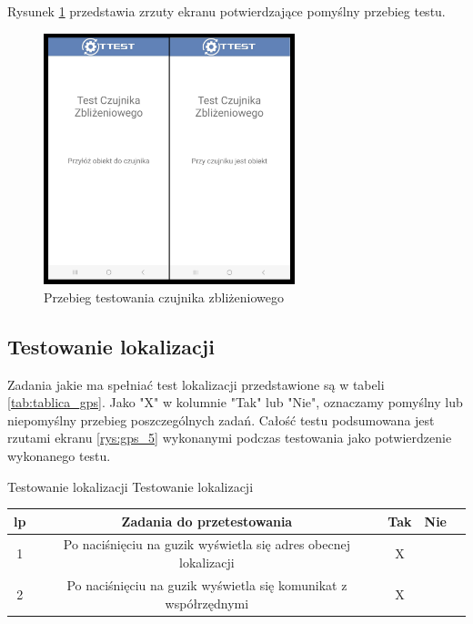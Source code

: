 Rysunek \ref{rys:zblizeniowy} przedstawia zrzuty ekranu potwierdzające pomyślny przebieg testu.

\begin{figure}[!hbt]
	\begin{center}
		\includegraphics[angle=360, width=0.65\textwidth]{rys/punkt5/zblizeniowy.png}
		\caption{Przebieg testowania czujnika zbliżeniowego}
		\label{rys:zblizeniowy}
	\end{center}
\end{figure}   

\newpage


\subsection{Testowanie lokalizacji}

\hspace{0.60cm}Zadania jakie ma spełniać test lokalizacji przedstawione są w tabeli \ref{tab:tablica_gps}. Jako "X" w kolumnie "Tak" lub "Nie", oznaczamy pomyślny lub niepomyślny przebieg poszczególnych zadań. Całość testu podsumowana jest rzutami ekranu \ref{rys:gps_5} wykonanymi podczas testowania jako potwierdzenie wykonanego testu.

\begin{tabela}
	{Testowanie lokalizacji}	%
	{Testowanie lokalizacji}	%
	{
		\begin{tabular}{|c|c|c|c|c|} \hline
			\textbf{lp} & \textbf{Zadania do przetestowania} & \textbf{Tak} & \textbf{Nie} \\ \hline
			1 & Po naciśnięciu na guzik wyświetla się adres obecnej lokalizacji  & X & ~ \\ \hline
			2 & Po naciśnięciu na guzik wyświetla się komunikat z współrzędnymi & X & ~ \\ \hline
	\end{tabular}	}
	\label{tab:tablica_gps}
\end{tabela}


